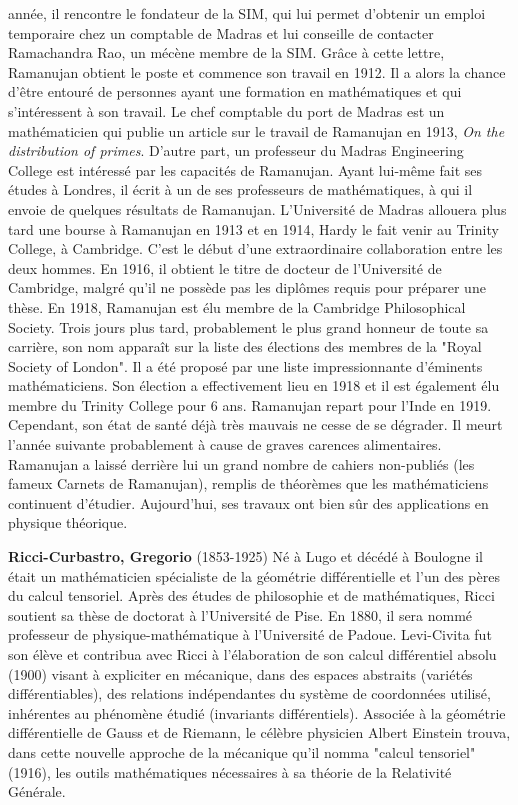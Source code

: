 année, il rencontre le fondateur de la SIM, qui lui permet d'obtenir un emploi temporaire chez un comptable de Madras et lui conseille de contacter Ramachandra Rao, un mécène membre de la SIM. Grâce à cette lettre, Ramanujan obtient le poste et commence son travail en 1912. Il a alors la chance d'être entouré de personnes ayant une formation en mathématiques et qui s'intéressent à son travail. Le chef comptable du port de Madras est un mathématicien qui publie un article sur le travail de Ramanujan en 1913, \textit{On the distribution of primes}. D'autre part, un professeur du Madras Engineering College est intéressé par les capacités de Ramanujan. Ayant lui-même fait ses études à Londres, il écrit à un de ses professeurs de mathématiques, à qui il envoie de quelques résultats de Ramanujan. L'Université de Madras allouera plus tard une bourse à Ramanujan en 1913 et en 1914, Hardy le fait venir au Trinity College, à Cambridge. C'est le début d'une extraordinaire collaboration entre les deux hommes. En 1916, il obtient le titre de docteur de l'Université de Cambridge, malgré qu'il ne possède pas les diplômes requis pour préparer une thèse. En 1918, Ramanujan est élu membre de la Cambridge Philosophical Society. Trois jours plus tard, probablement le plus grand honneur de toute sa carrière, son nom apparaît sur la liste des élections des membres de la "Royal Society of London". Il a été proposé par une liste impressionnante d'éminents mathématiciens. Son élection a effectivement lieu en 1918 et il est également élu membre du Trinity College pour 6 ans. Ramanujan repart pour l'Inde en 1919. Cependant, son état de santé déjà très mauvais ne cesse de se dégrader. Il meurt l'année suivante probablement à cause de graves carences alimentaires. Ramanujan a laissé derrière lui un grand nombre de cahiers non-publiés (les fameux Carnets de Ramanujan), remplis de théorèmes que les mathématiciens continuent d'étudier. Aujourd'hui, ses travaux ont bien sûr des applications en physique théorique.

\textbf{Ricci-Curbastro, Gregorio} (1853-1925) Né à Lugo et décédé à Boulogne il était un mathématicien spécialiste de la géométrie différentielle et l'un des pères du calcul tensoriel. Après des études de philosophie et de mathématiques, Ricci soutient sa thèse de doctorat à l'Université de Pise. En 1880, il sera nommé professeur de physique-mathématique à l'Université de Padoue. Levi-Civita fut son élève et contribua avec Ricci à l'élaboration de son calcul différentiel absolu (1900) visant à expliciter en mécanique, dans des espaces abstraits (variétés différentiables), des relations indépendantes du système de coordonnées utilisé, inhérentes au phénomène étudié (invariants différentiels). Associée à la géométrie différentielle de Gauss et de Riemann, le célèbre physicien Albert Einstein trouva, dans cette nouvelle approche de la mécanique qu'il nomma "calcul tensoriel" (1916), les outils mathématiques nécessaires à sa théorie de la Relativité Générale.


